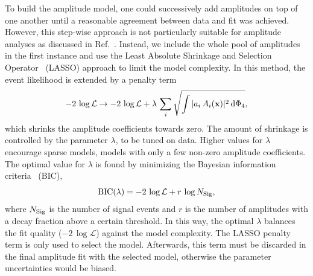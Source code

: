 To build the amplitude model, one could successively add amplitudes on top of one another until a reasonable agreement between data and fit was achieved.
However, this step-wise approach is not particularly suitable for amplitude analyses as discussed in Ref.~\cite{Guegan:2015mea}.
Instead, we include the whole pool of amplitudes in the first instance and use the 
Least Absolute Shrinkage and Selection Operator~\cite{Tibshirani94regressionshrinkage,Guegan:2015mea} (LASSO) approach to limit the model complexity.
In this method, the event likelihood is extended by a penalty term
\begin{equation}
	-2 \, \log \mathcal L \rightarrow -2 \, \log \mathcal L + \lambda \, \sum_{i} \sqrt{ \int \vert a_{i} \, A_{i}(\mathbf{x}) \vert^{2} \, \text{d}\Phi_{4}  },
\end{equation}
which 
shrinks the amplitude coefficients
towards zero.
The amount of shrinkage is controlled by the parameter $\lambda$, to be tuned on data.
Higher values for $\lambda$ encourage sparse models, \ie models with only a few non-zero amplitude coefficients.
The optimal value for $\lambda$ is found by minimizing the Bayesian information criteria~\cite{BIC} (BIC),
\begin{equation}
	\text{BIC}(\lambda) = - 2 \, \log \mathcal L + r  \, \log N_{\rm Sig},
\end{equation}
where $N_{\rm Sig}$ is the number of signal events and $r$ is the number of amplitudes with a decay fraction above 
a certain threshold.
In this way, the optimal $\lambda$ balances
the fit quality ($- 2 \, \log  \mathcal L$) against the model complexity.
The LASSO penalty term is only used to select the model. 
Afterwards, this term must be discarded in the final amplitude fit with the selected model, otherwise the parameter uncertainties would be biased. 

